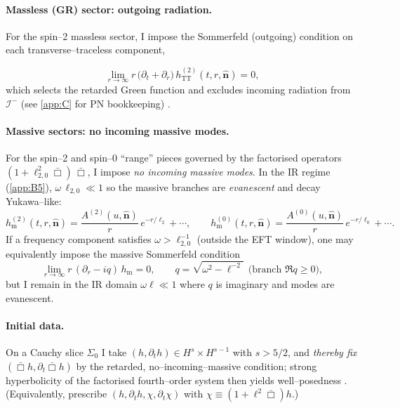 \documentclass{iopjournal}
\begin{document}
\paragraph{Massless (GR) sector: outgoing radiation.}
For the spin–2 massless sector, I impose the Sommerfeld (outgoing) condition on each transverse–traceless component,

\begin{equation}
\lim_{r\to\infty} r\,\Big(\partial_t+\partial_r\Big)\,h^{(2)}_{\mathrm{TT}}(t,r,\hat{\boldsymbol n})=0,
\label{eq:B4_Sommerfeld}
\end{equation}
which selects the retarded Green function and excludes incoming radiation from $\mathscr I^-$ (see \cref{app:C} for PN bookkeeping) \cite{PoissonWill2014,Blanchet2014LRR}.

\paragraph{Massive sectors: no incoming massive modes.}
For the spin–2 and spin–0 ``range'' pieces governed by the factorised operators
$(1+\ell_{2,0}^2\bar\Box)\,\bar\Box$, I impose \emph{no incoming massive modes}. In the IR regime (\cref{app:B5}), $\omega\,\ell_{2,0}\ll1$ so the massive branches are \emph{evanescent} and decay Yukawa–like:
\begin{equation}
h^{(2)}_{\mathrm{m}}(t,r,\hat{\boldsymbol n})=\frac{A^{(2)}(u,\hat{\boldsymbol n})}{r}\,e^{-r/\ell_2}+\cdots,
\qquad
h^{(0)}_{\mathrm{m}}(t,r,\hat{\boldsymbol n})=\frac{A^{(0)}(u,\hat{\boldsymbol n})}{r}\,e^{-r/\ell_0}+\cdots.
\label{eq:B4_Yukawa}
\end{equation}
If a frequency component satisfies $\omega>\ell_{2,0}^{-1}$ (outside the EFT window), one may equivalently impose the massive Sommerfeld condition
\[
\lim_{r\to\infty} r\,(\partial_r - i q)\,h_{\mathrm{m}}=0,
\qquad
q=\sqrt{\omega^2-\ell^{-2}}\ \ \text{(branch $\Re q\ge 0$)},
\]
but I remain in the IR domain $\omega\ell\ll1$ where $q$ is imaginary and modes are evanescent.

\paragraph{Initial data.}
    On a Cauchy slice $\Sigma_0$ I take $(h,\partial_t h)\in H^s\times H^{s-1}$ with $s>5/2$, and \emph{thereby fix} $(\bar\Box h,\partial_t\bar\Box h)$ by the retarded, no–incoming–massive condition; strong hyperbolicity of the factorised fourth–order system then yields well–posedness \cite{BGV2007}. (Equivalently, prescribe $(h,\partial_t h,\chi,\partial_t\chi)$ with $\chi\equiv(1+\ell^2\bar\Box)h$.)
\end{document}
